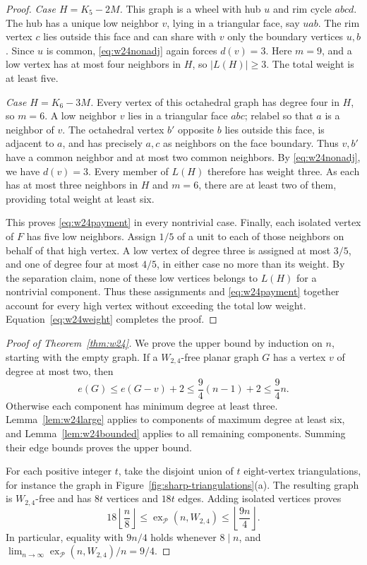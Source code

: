 \documentclass[11pt,a4paper]{article}
\theoremstyle{remark}
\newcommand{\ex}{\operatorname{ex}}
\newcommand{\PP}{\mathcal P}
\begin{document}
\begin{proof}
\smallskip\noindent
\emph{Case $H=K_5-2M$.}
This graph is a wheel with hub $u$ and rim cycle $abcd$. The hub has a
unique low neighbor $v$, lying in a triangular face, say $uab$.
The rim vertex $c$ lies outside this face and can share with $v$ only
the boundary vertices $u,b$. Since $u$ is common, \eqref{eq:w24nonadj}
again forces $d(v)=3$. Here $m=9$, and a low vertex has at most four
neighbors in $H$, so $|L(H)|\geq3$. The total weight is at least five.

\smallskip\noindent
\emph{Case $H=K_6-3M$.}
Every vertex of this octahedral graph has degree four in $H$, so $m=6$.
A low neighbor $v$ lies in a triangular face $abc$; relabel so that
$a$ is a neighbor of $v$. The octahedral vertex $b'$ opposite $b$ lies
outside this face, is adjacent to $a$, and has precisely $a,c$ as
neighbors on the face boundary. Thus $v,b'$ have a common neighbor
and at most two common neighbors. By \eqref{eq:w24nonadj},
we have $d(v)=3$. Every member of $L(H)$ therefore has weight three.
As each has at most three neighbors in $H$ and $m=6$, there are at
least two of them, providing total weight at least six.

This proves \eqref{eq:w24payment} in every nontrivial case.
Finally, each isolated vertex of $F$ has five low neighbors. Assign
$1/5$ of a unit to each of those neighbors on behalf of that high
vertex. A low vertex of degree three is assigned at most $3/5$, and
one of degree four at most $4/5$, in either case no more than its weight.
By the separation claim, none of these low vertices belongs to $L(H)$
for a nontrivial component. Thus these assignments and
\eqref{eq:w24payment} together account for every high vertex without
exceeding the total low weight. Equation~\eqref{eq:w24weight} completes
the proof.
\end{proof}

\begin{proof}[Proof of Theorem~\ref{thm:w24}]
We prove the upper bound by induction on $n$, starting with the empty
graph. If a $W_{2,4}$-free planar graph $G$ has a vertex $v$ of degree at
most two, then
\[
 e(G)\leq e(G-v)+2\leq\frac94(n-1)+2\leq\frac94n.
\]
Otherwise each component has minimum degree at least three.
Lemma~\ref{lem:w24large} applies to components of maximum degree at
least six, and Lemma~\ref{lem:w24bounded} applies to all remaining
components. Summing their edge bounds proves the upper bound.

For each positive integer $t$, take the disjoint union of $t$
eight-vertex triangulations, for instance the graph in Figure~\ref{fig:sharp-triangulations}(a). The resulting graph is $W_{2,4}$-free and has $8t$ vertices
and $18t$ edges. Adding isolated vertices proves
\[
 18\left\lfloor\frac n8\right\rfloor
 \leq\ex_{\PP}(n,W_{2,4})\leq\left\lfloor\frac{9n}{4}\right\rfloor.
\]
In particular, equality with $9n/4$ holds whenever $8\mid n$, and
$\lim_{n\to\infty}\ex_{\PP}(n,W_{2,4})/n=9/4$.
\end{proof}
\end{document}
